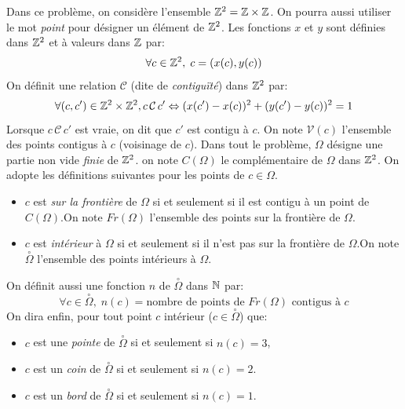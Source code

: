Dans ce problème, on considère l'ensemble $\mathbb{Z}^2 = \mathbb{Z}\times \mathbb{Z}$. On pourra aussi utiliser le mot \emph{point} pour désigner un élément de $\mathbb{Z}^2$.\newline
Les fonctions $x$ et $y$ sont définies dans $\mathbb{Z}^2$ et à valeurs dans $\mathbb{Z}$ par:
\begin{displaymath}
  \forall c\in \mathbb{Z}^2, \; c=(x(c),y(c))
\end{displaymath}
On définit une relation $\mathcal{C}$ (dite de \emph{contiguïté}) dans $\mathbb{Z}^2$ par:
\begin{displaymath}
  \forall (c,c')\in \mathbb{Z}^2 \times \mathbb{Z}^2, c \,\mathcal{C}\, c' \Leftrightarrow (x(c')-x(c))^2 + (y(c')-y(c))^2 = 1
 \end{displaymath}
Lorsque $c \,\mathcal{C}\, c'$ est vraie, on dit que $c'$ est contigu à $c$. On note $\mathcal{V}(c)$ l'ensemble des points contigus à $c$ (voisinage de $c$).\newline
Dans tout le problème, $\Omega$ désigne une partie non vide \emph{finie} de $\mathbb{Z}^2$. on note $C(\Omega)$ le complémentaire de $\Omega$ dans $\mathbb{Z}^2$. On adopte les définitions suivantes pour les points de $c\in\Omega$.
\begin{itemize}
  \item $c$ est \emph{sur la frontière} de $\Omega$ si et seulement si il est contigu à un point de $C(\Omega)$.\newline On note $Fr(\Omega)$ l'ensemble des points sur la frontière de $\Omega$.
  \item $c$ est \emph{intérieur} à $\Omega$ si et seulement si il n'est pas sur la frontière de $\Omega$.\newline On note $\overset{\circ}{\Omega}$ l'ensemble des points intérieurs à $\Omega$.
\end{itemize}
On définit aussi une fonction $n$ de $\overset{\circ}{\Omega}$ dans $\mathbb{N}$ par:
\begin{displaymath}
  \forall c \in \overset{\circ}{\Omega},\;n(c) = \text{nombre de points de $Fr(\Omega)$ contigus à $c$}
\end{displaymath}
On dira enfin, pour tout point $c$ intérieur ($c\in \overset{\circ}{\Omega}$) que:
\begin{itemize}
  \item $c$ est une \emph{pointe} de $\overset{\circ}{\Omega}$ si et seulement si $n(c) = 3$,
  \item $c$ est un \emph{coin} de $\overset{\circ}{\Omega}$ si et seulement si $n(c) = 2$.
  \item $c$ est un \emph{bord} de $\overset{\circ}{\Omega}$ si et seulement si $n(c) = 1$.
\end{itemize}


